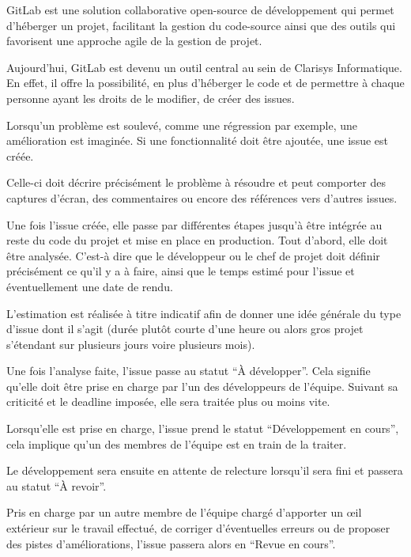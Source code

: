 GitLab est une solution collaborative open-source de développement qui permet d’héberger un projet, facilitant la gestion du code-source ainsi que des outils qui favorisent une approche agile de la gestion de projet.

Aujourd’hui, GitLab est devenu un outil central au sein de Clarisys Informatique. En effet, il offre la possibilité, en plus d’héberger le code et de permettre à chaque personne ayant les droits de le modifier, de créer des issues. 

Lorsqu’un problème est soulevé, comme une régression par exemple, une amélioration est imaginée.  Si une fonctionnalité doit être ajoutée, une issue est créée. 

Celle-ci doit décrire précisément le problème à résoudre et peut comporter des captures d’écran, des commentaires ou encore des références vers d’autres issues.

Une fois l’issue créée, elle passe par différentes étapes jusqu’à être intégrée au reste du code du projet et mise en place en production. Tout d’abord, elle doit être analysée. C'est-à dire que le développeur ou le chef de projet doit définir précisément ce qu’il y a à faire, ainsi que le temps estimé pour l’issue et éventuellement une date de rendu.

 L’estimation est réalisée à titre indicatif afin de donner une idée générale du type d’issue dont il s’agit (durée plutôt courte d’une heure ou alors gros projet s’étendant sur plusieurs jours voire plusieurs mois).

Une fois l’analyse faite, l’issue passe au statut “À développer”. Cela signifie qu’elle doit être prise en charge par l’un des développeurs de l’équipe. Suivant sa criticité et le deadline imposée, elle sera traitée plus ou moins vite. 

Lorsqu’elle est prise en charge, l’issue prend le statut “Développement en cours”, cela implique qu’un des membres de l’équipe est en train de la traiter. 

Le développement sera ensuite en attente de relecture lorsqu’il sera fini et passera au statut “À revoir”. 

Pris en charge par un autre membre de l’équipe chargé d’apporter un œil extérieur sur le travail effectué, de corriger d'éventuelles erreurs ou de proposer des pistes d’améliorations, l’issue passera alors en “Revue en cours”.

